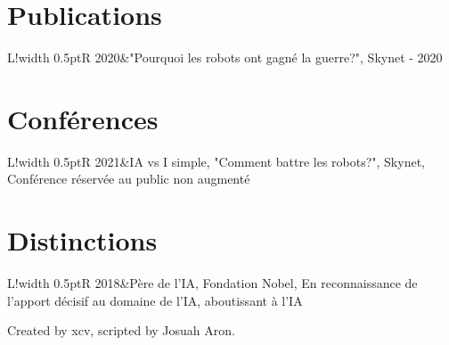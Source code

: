 \documentclass[10pt]{article}
\newcommand\VRule{\color{lightgray}\vrule width 0.5pt}
\begin{document}
\section*{Publications}
\begin{tabular}{L!{\VRule}R}
2020&"Pourquoi les robots ont gagné la guerre?", Skynet - 2020\\
\end{tabular}

\section*{Conférences}
\begin{tabular}{L!{\VRule}R}
2021&IA vs I simple, "Comment battre les robots?", Skynet, Conférence réservée au public non augmenté\\

\end{tabular}

\section*{Distinctions}
\begin{tabular}{L!{\VRule}R}
2018&Père de l'IA, Fondation Nobel, En reconnaissance de l'apport décisif au domaine de l'IA, aboutissant à l'IA\\
\end{tabular}


{\vspace{20pt}%
\vspace{20pt}
\scriptsize\hfill Created by xcv, scripted by Josuah Aron.}
\end{document}
